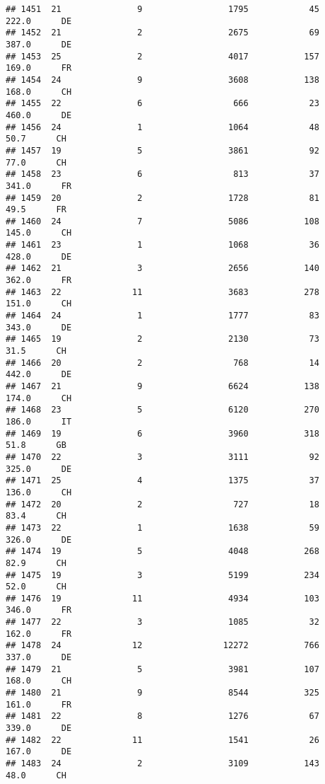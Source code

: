 \documentclass[
]{article}
\begin{document}
\begin{verbatim}
## 1451  21               9                 1795            45    222.0      DE
## 1452  21               2                 2675            69    387.0      DE
## 1453  25               2                 4017           157    169.0      FR
## 1454  24               9                 3608           138    168.0      CH
## 1455  22               6                  666            23    460.0      DE
## 1456  24               1                 1064            48     50.7      CH
## 1457  19               5                 3861            92     77.0      CH
## 1458  23               6                  813            37    341.0      FR
## 1459  20               2                 1728            81     49.5      FR
## 1460  24               7                 5086           108    145.0      CH
## 1461  23               1                 1068            36    428.0      DE
## 1462  21               3                 2656           140    362.0      FR
## 1463  22              11                 3683           278    151.0      CH
## 1464  24               1                 1777            83    343.0      DE
## 1465  19               2                 2130            73     31.5      CH
## 1466  20               2                  768            14    442.0      DE
## 1467  21               9                 6624           138    174.0      CH
## 1468  23               5                 6120           270    186.0      IT
## 1469  19               6                 3960           318     51.8      GB
## 1470  22               3                 3111            92    325.0      DE
## 1471  25               4                 1375            37    136.0      CH
## 1472  20               2                  727            18     83.4      CH
## 1473  22               1                 1638            59    326.0      DE
## 1474  19               5                 4048           268     82.9      CH
## 1475  19               3                 5199           234     52.0      CH
## 1476  19              11                 4934           103    346.0      FR
## 1477  22               3                 1085            32    162.0      FR
## 1478  24              12                12272           766    337.0      DE
## 1479  21               5                 3981           107    168.0      CH
## 1480  21               9                 8544           325    161.0      FR
## 1481  22               8                 1276            67    339.0      DE
## 1482  22              11                 1541            26    167.0      DE
## 1483  24               2                 3109           143     48.0      CH

\end{verbatim}
\end{document}
